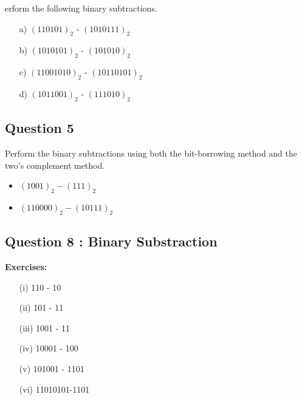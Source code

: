 \documentclass[12pt]{article}
\begin{document}
erform the following binary subtractions.
  \begin{multicols}{2}
    \begin{itemize}
    \item[a)] $(110101)_{2}$ - $(1010111)_{2}$
    \item[b)] $(1010101)_{2}$ - $(101010)_{2}$
    \item[c)] $(11001010)_{2}$ - $(10110101)_{2}$
    \item[d)] $(1011001)_{2}$ - $(111010)_{2}$
    \end{itemize}
  \end{multicols}

    
\subsection*{Question 5}

Perform the binary subtractions using both the bit-borrowing method and the two's complement method.
\begin{itemize}
\item $(1001)_2 -(111)_2$
\item $(110000)_2 -(10111)_2$
\end{itemize}

\subsection*{Question 8 : Binary Substraction}
\textbf{Exercises:}

\begin{multicols}{2}
	\begin{itemize}
		\item[(i)] 110 - 10	
		\item[(ii)] 101 - 11  
		\item[(iii)] 1001 - 11	
		\item[(iv)] 10001 - 100 
		\item[(v)] 101001 - 1101
		\item[(vi)] 11010101-1101
	\end{itemize}
\end{multicols}
\end{document}
